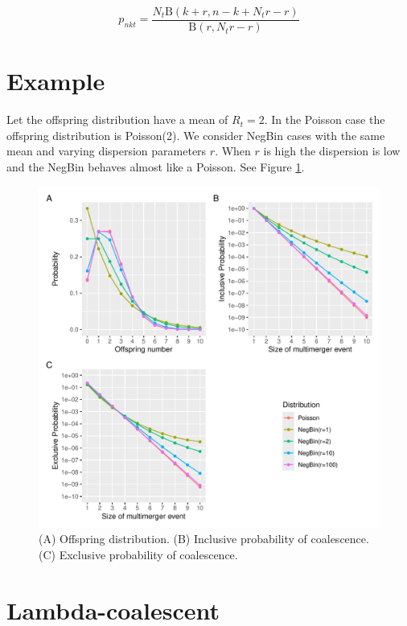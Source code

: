 \documentclass{article}
\begin{document}
\begin{equation}
p_{nkt}=\frac{N_t \mathrm{B}(k+r, n-k+N_t r-r)}{\mathrm{B}(r, N_t r-r)}
\end{equation}

\section{Example}

Let the offspring distribution have a mean of $R_t=2$. In the Poisson case the offspring distribution is Poisson(2). We consider NegBin cases with the same mean and varying dispersion parameters $r$. When $r$ is high the dispersion is low and the NegBin behaves almost like a Poisson.
See Figure \ref{fig:probs}.

\begin{figure}[t!]
\begin{center}
\includegraphics[width=15cm]{../run/figure.pdf}
\end{center}
\caption{(A) Offspring distribution. (B) Inclusive probability of coalescence. (C) Exclusive probability of coalescence.
\label{fig:probs}}
\end{figure}

\section{Lambda-coalescent}
\end{document}

